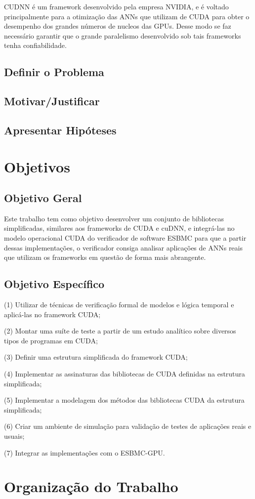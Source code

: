   CUDNN é um framework desenvolvido pela empresa NVIDIA, e é voltado principalmente para a otimização das ANNs que utilizam de CUDA para obter o desempenho dos grandes números de nucleos das GPUs. Desse modo se faz necessário garantir que o grande paralelismo desenvolvido sob tais frameworks tenha confiabilidade.

\subsection{Definir o Problema}
\subsection{Motivar/Justificar}
\subsection{Apresentar Hipóteses}
\section{Objetivos}
\subsection{Objetivo Geral}
Este trabalho tem como objetivo desenvolver um conjunto de bibliotecas simplificadas, similares aos frameworks de CUDA e cuDNN, e integrá-las no modelo operacional CUDA do verificador de software ESBMC para que a partir dessas implementações, o verificador consiga analisar aplicações de ANNs reais que utilizam os frameworks em questão de forma mais abrangente.

\subsection{Objetivo Específico}
(1)	Utilizar de técnicas de verificação formal de modelos e lógica temporal e aplicá-las no framework CUDA; 

(2)	Montar uma suíte de teste a partir de um estudo analítico sobre diversos tipos de programas em CUDA;

(3)	Definir uma estrutura simplificada do framework CUDA; 

(4)	Implementar as assinaturas das bibliotecas de CUDA definidas na estrutura simplificada;

(5)	Implementar a modelagem dos métodos das bibliotecas CUDA da estrutura simplificada;

(6)	Criar um ambiente de simulação para validação de testes de aplicações reais e usuais;

(7)	Integrar as implementações com o ESBMC-GPU.

\section{Organização do Trabalho}


